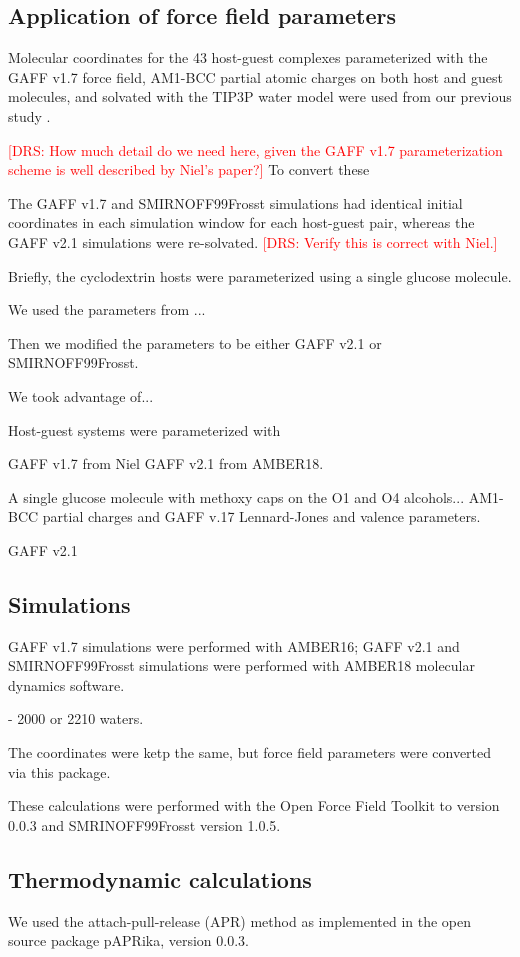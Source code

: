 \documentclass[9pt,lineno]{elife}
\newcommand{\drsnote}[1]{ {\textcolor{red} { [DRS: #1] }}}
\newcommand{\drsnote}[1]{}
\begin{document}
\subsection{Application of force field parameters}
Molecular coordinates for the 43 host-guest complexes parameterized with the GAFF v1.7 force field, AM1-BCC partial atomic charges on both host and guest molecules, and solvated with the TIP3P water model were used from our previous study \cite{henriksen_evaluating_2017}.



\drsnote{How much detail do we need here, given the GAFF v1.7 parameterization scheme is well described by Niel's paper?}
To convert these 


The GAFF v1.7 and SMIRNOFF99Frosst simulations had identical initial coordinates in each simulation window for each host-guest pair, whereas the GAFF v2.1 simulations were re-solvated. 
\drsnote{Verify this is correct with Niel.}

Briefly, the cyclodextrin hosts were parameterized using a single glucose molecule.

We used the parameters from ...

Then we modified the parameters to be either GAFF v2.1 or SMIRNOFF99Frosst. 

We took advantage of... 

Host-guest systems were parameterized with 

GAFF v1.7 from Niel
GAFF v2.1 from AMBER18.


A single glucose molecule with methoxy caps on the O1 and O4 alcohols... AM1-BCC partial charges and GAFF v.17 Lennard-Jones and valence parameters.

GAFF v2.1 

\subsection{Simulations}
GAFF v1.7 simulations were performed with AMBER16; GAFF v2.1 and SMIRNOFF99Frosst simulations were performed with AMBER18 molecular dynamics software.

- 2000 or 2210 waters.


The coordinates were ketp the same, but force field parameters were converted via this package.


These calculations were performed with the Open Force Field Toolkit to version 0.0.3 and SMRINOFF99Frosst version 1.0.5.


\subsection{Thermodynamic calculations}
We used the attach-pull-release (APR) method as implemented in the open source package pAPRika, version 0.0.3.
\end{document}
